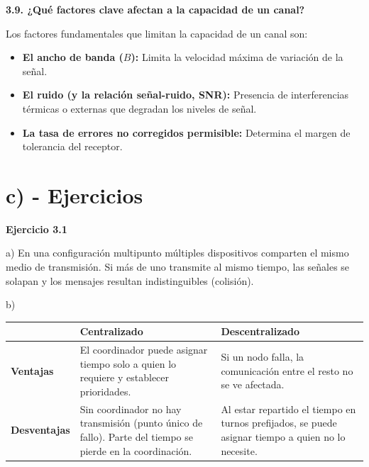 \documentclass[11pt,a4paper]{article}
\begin{document}
\vspace{0.3cm}
\noindent\textbf{3.9. ¿Qué factores clave afectan a la capacidad de un canal?}\par
Los factores fundamentales que limitan la capacidad de un canal son:
\begin{itemize}
  \item \textbf{El ancho de banda ($B$):} Limita la velocidad máxima de variación de la señal.
  \item \textbf{El ruido (y la relación señal-ruido, SNR):} Presencia de interferencias térmicas o externas que degradan los niveles de señal.
  \item \textbf{La tasa de errores no corregidos permisible:} Determina el margen de tolerancia del receptor.
\end{itemize}

\newpage
\section*{c) - Ejercicios}

\noindent\textbf{Ejercicio 3.1}\par
\noindent a) En una configuración multipunto múltiples dispositivos comparten el mismo medio de transmisión. Si más de uno transmite al mismo tiempo, las señales se solapan y los mensajes resultan indistinguibles (colisión).\par
\noindent b)
\begin{center}
  \begin{tabular}{|l|p{}|p{}|}
    \hline
    & \textbf{Centralizado} & \textbf{Descentralizado} \\
    \hline
    \textbf{Ventajas} &
    El coordinador puede asignar tiempo solo a quien lo requiere y establecer prioridades. &
    Si un nodo falla, la comunicación entre el resto no se ve afectada. \\
    \hline
    \textbf{Desventajas} &
    Sin coordinador no hay transmisión (punto único de fallo). Parte del tiempo se pierde en la coordinación. &
    Al estar repartido el tiempo en turnos prefijados, se puede asignar tiempo a quien no lo necesite. \\
    \hline
  \end{tabular}
\end{center}
\end{document}
